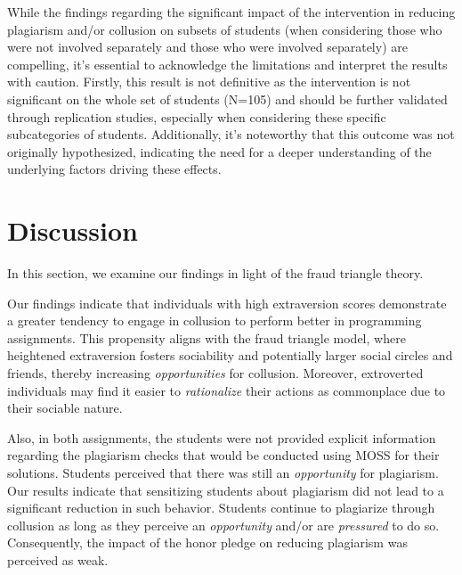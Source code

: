 While the findings regarding the significant impact of the intervention in reducing plagiarism and/or collusion on subsets of students (when considering those who were not involved separately and those who were involved separately) are compelling, it's essential to acknowledge the limitations and interpret the results with caution. Firstly, this result is not definitive as the intervention is not significant on the whole set of students (N=105) and should be further validated through replication studies, especially when considering these specific subcategories of students. Additionally, it's noteworthy that this outcome was not originally hypothesized, indicating the need for a deeper understanding of the underlying factors driving these effects.

\section{Discussion} \label{sec:discuss}

In this section, we examine our findings in light of the fraud triangle theory.

Our findings indicate that individuals with high extraversion scores demonstrate a greater tendency to engage in collusion to perform better in programming assignments. This propensity aligns with the fraud triangle model, where heightened extraversion fosters sociability and potentially larger social circles and friends, thereby increasing \emph{opportunities} for collusion. Moreover, extroverted individuals may find it easier to \emph{rationalize} their actions as commonplace due to their sociable nature.

Also, in both assignments, the students were not provided explicit information regarding the plagiarism checks that would be conducted using MOSS for their solutions. Students perceived that there was still an \emph{opportunity} for plagiarism. Our results indicate that sensitizing students about plagiarism did not lead to a significant reduction in such behavior. Students continue to plagiarize through collusion as long as they perceive an \textit{opportunity} and/or are \textit{pressured} to do so. Consequently, the impact of the honor pledge on reducing plagiarism was perceived as weak.

